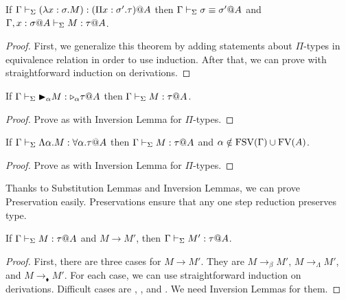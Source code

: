 \begin{lemma}
	If $\Gamma \vdash_\Sigma (\lambda x:\sigma.M) : (\Pi x:\sigma'.\tau)@A$
	then $\Gamma \vdash_\Sigma \sigma \equiv \sigma'@A$ and $\G ,x:\sigma@A\V M:\tau @A$.
\end{lemma}

\begin{proof}
	First, we generalize this theorem by adding statements about $\Pi$-types in equivalence relation in order to use induction.
	After that, we can prove with straightforward induction on derivations.
\end{proof}

\begin{lemma}
	If $\Gamma \vdash_\Sigma {\mathop{\blacktriangleright}}_\alpha M : {\mathop{\triangleright}}_\alpha \tau @A$ then $\Gamma \vdash_\Sigma M : \tau @A$.
\end{lemma}

\begin{proof}
	Prove as with Inversion Lemma for $\Pi$-types.
\end{proof}

\begin{lemma}
	If $\Gamma \vdash_\Sigma \Lambda\alpha.M : \forall\alpha.\tau @A$ then $\Gamma \vdash_\Sigma M : \tau @A$ and $\alpha \notin \text{FSV}(\Gamma) \cup \text{FV}(A)$.
\end{lemma}

\begin{proof}
	Prove as with Inversion Lemma for $\Pi$-types.
\end{proof}


Thanks to Substitution Lemmas and Inversion Lemmas, we can prove Preservation easily.
Preservations ensure that any one step reduction preserves type.

\begin{theorem}[Preservation]
	If $\Gamma\vdash_\Sigma M:\tau @A$ and $M \longrightarrow M'$, then $\Gamma\vdash_\Sigma M':\tau @A$.
\end{theorem}

\begin{proof}
	First, there are three cases for $M \longrightarrow M'$.
	They are $M \longrightarrow_\beta M'$, $M \longrightarrow_\Lambda M'$, and $M \longrightarrow_\blacklozenge M'$.
	For each case, we can use straightforward induction on derivations.
	Difficult cases are \TApp, \TTBL, and \TIns.
	We need Inversion Lemmas for them.
\end{proof}


